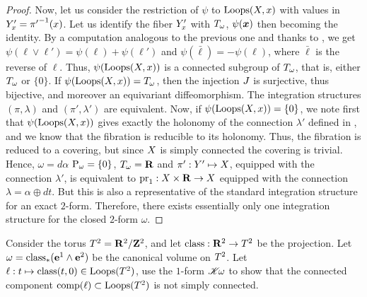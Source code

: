 \begin{proof}
  Now,
  let us consider the restriction of $\psi$ to $\operatorname{Loops}(X,x)$ with values in $Y'_x = {\pi'}^{-1}(x)$.
  Let us identify the fiber $Y'_x$ with $T_\omega$, $\psi({\boldsymbol x})$ then becoming the identity.
  By a computation analogous to the previous one and thanks to ,
  we get $\psi(\ell \vee \ell') = \psi(\ell) + \psi(\ell')$ and $\psi(\bar\ell) = - \psi(\ell)$,
  where $\bar\ell$ is the reverse of $\ell$.
  Thus, $\psi(\operatorname{Loops}(X,x))$ is a connected subgroup of $T_\omega$,
  that is,
  either $T_\omega$ or $\{0\}$.
  If $\psi(\operatorname{Loops}(X,x)) = T_\omega$,
  then the injection $J$ is surjective,
  thus bijective,
  and moreover an equivariant diffeomorphism.
  The integration structures $(\pi,\lambda)$ and $(\pi',\lambda')$ are equivalent.
  Now, if $\psi(\operatorname{Loops}(X,x)) = \{0\}$,
  we note first that $\psi(\operatorname{Loops}(X,x))$ gives exactly the holonomy of the connection $\lambda'$ defined in ,
  and we know that the fibration is reducible to its holonomy.
  Thus,
  the fibration is reduced to a covering,
  but since $X$ is simply connected the covering is trivial.
  Hence,
  $\omega = d\alpha$ ${\operatorname{P}}_\omega = \{0\}$, $T_\omega = {\mathbf R}$ and $\pi' : Y' \mapsto X$,
  equipped with the connection $\lambda'$,
  is equivalent to $\mathrm{pr}_1 : X \times {\mathbf R} \to X$ equipped with the connection $\lambda = \alpha \oplus dt$.
  But this is also a representative of the standard integration structure for an exact $2$-form.
  Therefore,
  there exists essentially only one integration structure for the closed $2$-form  $\omega$.
\end{proof}

%
%

\Exercises

\begin{exercise}
  \label{Loops-in-the-torus}
  Consider the torus $T^2 = {\mathbf R}^2/{\mathbf Z}^2$,
  and let $\operatorname{class} : {\mathbf R}^2 \to T^2$ be the projection.
  Let $\omega = \operatorname{class}_*({\bf e}^1 \wedge {\bf e}^2)$ be the canonical volume on $T^2$.
  Let $\ell : t \mapsto \operatorname{class}(t,0) \in \operatorname{Loops}(T^2)$,
  use the $1$-form $\mathscr{K}\!\omega$ to show that the connected component $\operatorname{comp}(\ell) \subset \operatorname{Loops}(T^2)$ is not simply connected.
\end{exercise} %

